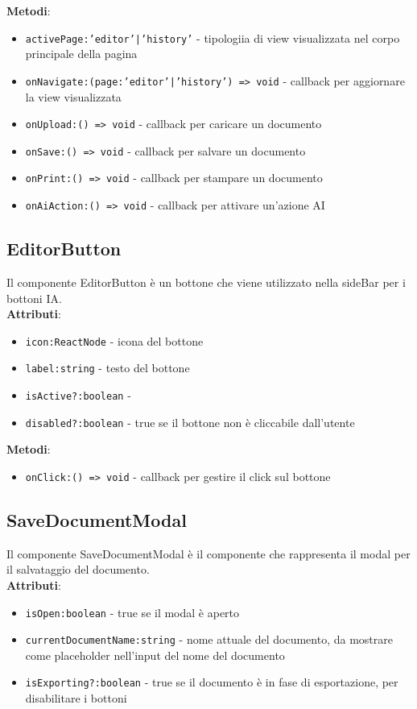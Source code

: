 \documentclass[11pt,a4paper]{article}
\begin{document}
\textbf{Metodi}:
\begin{itemize}
    \item \texttt{activePage:'editor'|'history'} - tipologiia di view visualizzata nel corpo principale della pagina
    \item \texttt{onNavigate:(page:'editor'|'history') => void} - callback per aggiornare la view visualizzata
    \item \texttt{onUpload:() => void} - callback per caricare un documento
    \item \texttt{onSave:() => void} - callback per salvare un documento
    \item \texttt{onPrint:() => void} - callback per stampare un documento
    \item \texttt{onAiAction:() => void} - callback per attivare un'azione AI
\end{itemize}

\subsection{EditorButton}
Il componente EditorButton è un bottone che viene utilizzato nella sideBar per i bottoni IA.\\

\textbf{Attributi}:
\begin{itemize}
    \item \texttt{icon:ReactNode} - icona del bottone
    \item \texttt{label:string} - testo del bottone
    \item \texttt{isActive?:boolean} - 
    \item \texttt{disabled?:boolean} - true se il bottone non è cliccabile dall'utente
\end{itemize}

\textbf{Metodi}:
\begin{itemize}
    \item \texttt{onClick:() => void} - callback per gestire il click sul bottone
\end{itemize}

\subsection{SaveDocumentModal}
Il componente SaveDocumentModal è il componente che rappresenta il modal per il salvataggio del documento.\\

\textbf{Attributi}:
\begin{itemize}
    \item \texttt{isOpen:boolean} - true se il modal è aperto
    \item \texttt{currentDocumentName:string} - nome attuale del documento, da mostrare come placeholder nell'input del nome del documento
    \item \texttt{isExporting?:boolean} - true se il documento è in fase di esportazione, per disabilitare i bottoni
\end{itemize}
\end{document}
